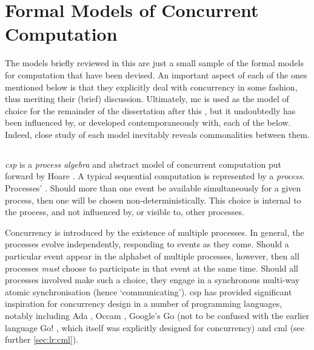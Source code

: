 \section{\label{sec:lr:formalmodels}Formal Models of Concurrent Computation}

The models briefly reviewed in this  are just a small sample of the formal models for computation that have been devised.  An important aspect of each of the ones mentioned below is that they explicitly deal with concurrency in some fashion, thus meriting their (brief) discussion.  Ultimately, \gls{mc} is used as the model of choice for the remainder of the dissertation after this , but it undoubtedly has been influenced by, or developed contemporaneously with, each of the below.  Indeed, close study of each model inevitably reveals commonalities between them.

\subsection{\label{subsec:lr:csp}}

\emph{\Gls{csp}} is a \emph{process algebra} and abstract model of concurrent computation put forward by Hoare \cite{Hoare1985,Roscoe2011}.  A typical sequential computation is represented by a \emph{process}.  Processes' .  Should more than one event be available simultaneously for a given process, then one will be chosen non-deterministically.  This choice is internal to the process, and not influenced by, or visible to, other processes.

Concurrency is introduced by the existence of multiple processes.  In general, the processes evolve independently, responding to events as they come.  Should a particular event appear in the alphabet of multiple processes, however, then all processes \emph{must} choose to participate in that event at the same time.  Should all processes involved make such a choice, they engage in a synchronous multi-way atomic synchronisation (hence `communicating').  \gls{csp} has provided significant inspiration for concurrency design in a number of programming languages, notably including Ada \cite{Defense1983,Taft2013}, Occam \cite{Elizabeth1987}, Google's Go \cite{Meyerson2014} (not to be confused with the earlier language Go! \cite{Clark2004}, which itself was explicitly designed for concurrency) and \gls{cml} \cite{Reppy2011} (see further \vref{sec:lr:cml}).  

